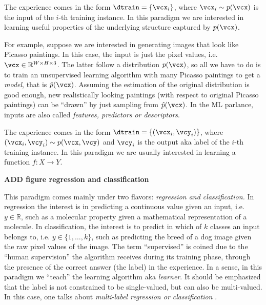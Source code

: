 \begin{definition}[name=Unsupervised learning]
	The experience comes in the form $\dtrain = \{\vcx_i\}$, where $\vcx_i \sim
	p(\vcx)$ is the input of the $i$-th training
	instance. In this paradigm we are interested in
	learning useful properties of the underlying structure captured by
	$p(\vcx)$.
\end{definition}

For example, suppose we are interested in generating images that look like
Picasso paintings. In this case, the input is just the pixel values, i.e.  $\vcx
\in \mathbb{R}^{W \times H \times 3}$. The latter follow a distribution
$p(\vcx)$, so all we have to do is to train an unsupervised learning algorithm
with many Picasso paintings to get a \emph{model}, that is $\hat{p}(\vcx)$.
Assuming the estimation of the original distribution is good enough, new
realistically looking paintings (with respect to original Picasso paintings) can
be ``drawn'' by just sampling from $\hat{p}(\vcx)$. In the ML parlance, inputs
are also called \emph{features, predictors or
descriptors}.

\begin{definition}[name=Supervised learning]
	The experience comes in the form $\dtrain = \{(\vcx_i, \vcy_i)\}$, where
	$(\vcx_i, \vcy_i) \sim p(\vcx, \vcy)$ and $\vcy_i$ is the
	output aka label of the $i$-th training instance.
	In this paradigm we are usually interested in learning a function $f \colon
	X \to Y$.
\end{definition}

\textbf{ADD figure regression and classification}

This paradigm comes mainly under two flavors: \emph{regression
and classification.} In regression the interest is in
predicting a continuous value given an input, i.e.  $y \in \mathbb{R}$, such as
a molecular property given a mathematical representation of a molecule. In
classification, the interest is to predict in which of $k$ classes an input
belongs to, i.e. $y \in \{1, \ldots, k\}$, such as predicting the breed of a dog
image given the raw pixel values of the image. The term ``supervised'' is coined
due to the ``human supervision'' the algorithm receives during its training
phase, through the presence of the correct answer (the label) in the experience.
In a sense, in this paradigm we ``teach'' the learning algorithm aka
\emph{learner}. It should be emphasized that the label is not constrained to be
single-valued, but can also be multi-valued. In this case, one talks about
\emph{multi-label regression or
classification} \parencite{Read_2009}.


